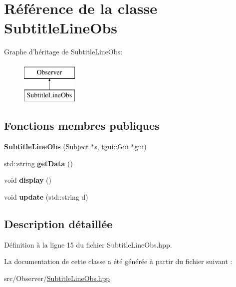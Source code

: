 \hypertarget{classSubtitleLineObs}{\section{Référence de la classe Subtitle\+Line\+Obs}
\label{classSubtitleLineObs}
}
Graphe d'héritage de Subtitle\+Line\+Obs\+:\begin{figure}[H]
\begin{center}
\leavevmode
\includegraphics[height=2.000000cm]{classSubtitleLineObs}
\end{center}
\end{figure}
\subsection*{Fonctions membres publiques}
\begin{DoxyCompactItemize}
\item 
\hypertarget{classSubtitleLineObs_a3bfe134db1948a08b869f6671070ed1d}{{\bfseries Subtitle\+Line\+Obs} (\hyperlink{classSubject}{Subject} $\ast$s, tgui\+::\+Gui $\ast$gui)}\label{classSubtitleLineObs_a3bfe134db1948a08b869f6671070ed1d}

\item 
\hypertarget{classSubtitleLineObs_a74983bcd67169fa7cabd03f156affa04}{std\+::string {\bfseries get\+Data} ()}\label{classSubtitleLineObs_a74983bcd67169fa7cabd03f156affa04}

\item 
\hypertarget{classSubtitleLineObs_a57cab0db5ead28c8692f3793f5f50270}{void {\bfseries display} ()}\label{classSubtitleLineObs_a57cab0db5ead28c8692f3793f5f50270}

\item 
\hypertarget{classSubtitleLineObs_a5aab5a727bb01f5d8adc5d31a7521b13}{void {\bfseries update} (std\+::string d)}\label{classSubtitleLineObs_a5aab5a727bb01f5d8adc5d31a7521b13}

\end{DoxyCompactItemize}


\subsection{Description détaillée}


Définition à la ligne 15 du fichier Subtitle\+Line\+Obs.\+hpp.



La documentation de cette classe a été générée à partir du fichier suivant \+:\begin{DoxyCompactItemize}
\item 
src/\+Observer/\hyperlink{SubtitleLineObs_8hpp}{Subtitle\+Line\+Obs.\+hpp}\end{DoxyCompactItemize}

